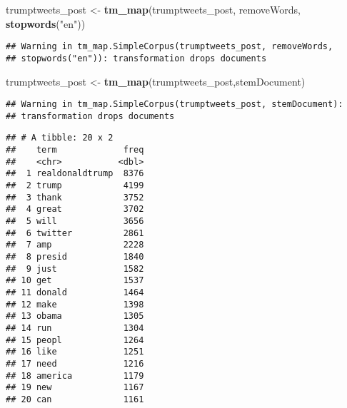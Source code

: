 \documentclass[]{article}
\newenvironment{Shaded}{\begin{snugshade}}{\end{snugshade}}
\newcommand{\KeywordTok}[1]{\textcolor[rgb]{0.13,0.29,0.53}{\textbf{#1}}}
\newcommand{\DataTypeTok}[1]{\textcolor[rgb]{0.13,0.29,0.53}{#1}}
\newcommand{\DecValTok}[1]{\textcolor[rgb]{0.00,0.00,0.81}{#1}}
\newcommand{\StringTok}[1]{\textcolor[rgb]{0.31,0.60,0.02}{#1}}
\newcommand{\OperatorTok}[1]{\textcolor[rgb]{0.81,0.36,0.00}{\textbf{#1}}}
\newcommand{\NormalTok}[1]{#1}
\begin{document}
\begin{Shaded}
\begin{Highlighting}[]
\NormalTok{trumptweets_post <-}\StringTok{ }\KeywordTok{tm_map}\NormalTok{(trumptweets_post, removeWords, }\KeywordTok{stopwords}\NormalTok{(}\StringTok{"en"}\NormalTok{))}
\end{Highlighting}
\end{Shaded}

\begin{verbatim}
## Warning in tm_map.SimpleCorpus(trumptweets_post, removeWords,
## stopwords("en")): transformation drops documents
\end{verbatim}

\begin{Shaded}
\begin{Highlighting}[]
\NormalTok{trumptweets_post <-}\StringTok{ }\KeywordTok{tm_map}\NormalTok{(trumptweets_post,stemDocument)}
\end{Highlighting}
\end{Shaded}

\begin{verbatim}
## Warning in tm_map.SimpleCorpus(trumptweets_post, stemDocument):
## transformation drops documents
\end{verbatim}

\begin{Shaded}
\end{Shaded}

\begin{verbatim}
## # A tibble: 20 x 2
##    term             freq
##    <chr>           <dbl>
##  1 realdonaldtrump  8376
##  2 trump            4199
##  3 thank            3752
##  4 great            3702
##  5 will             3656
##  6 twitter          2861
##  7 amp              2228
##  8 presid           1840
##  9 just             1582
## 10 get              1537
## 11 donald           1464
## 12 make             1398
## 13 obama            1305
## 14 run              1304
## 15 peopl            1264
## 16 like             1251
## 17 need             1216
## 18 america          1179
## 19 new              1167
## 20 can              1161
\end{verbatim}
\end{document}
